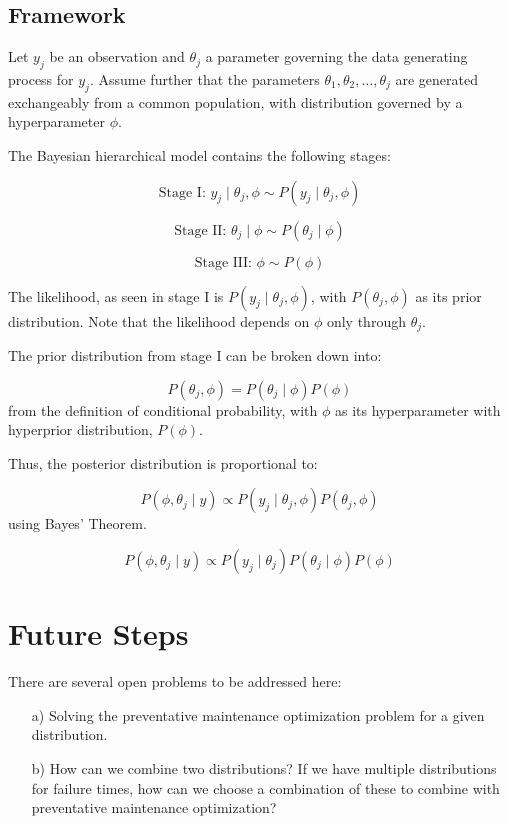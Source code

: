 \documentclass[english]{article}
\numberwithin{equation}{section}
\begin{document}
\subsection*{Framework}

Let $y_j$ be an observation and $\theta_j$ a parameter governing the data generating process for $y_j$. Assume further that the parameters $\theta_1, \theta_2, \ldots, \theta_j$ are generated exchangeably from a common population, with distribution governed by a hyperparameter $\phi$. 

The Bayesian hierarchical model contains the following stages:

$$\text{Stage I: } y_j\mid\theta_j,\phi \sim P(y_j\mid\theta_j,\phi)$$

$$\text{Stage II: } \theta_j\mid\phi \sim P(\theta_j\mid\phi)$$

$$\text{Stage III: } \phi \sim P(\phi)$$

The likelihood, as seen in stage I is $P(y_j\mid\theta_j,\phi)$, with $P(\theta_j,\phi)$ as its prior distribution. Note that the likelihood depends on $\phi$ only through $\theta_j$.

The prior distribution from stage I can be broken down into:

$$P(\theta_j,\phi) = P(\theta_j\mid\phi)P(\phi)$$ from the definition of conditional probability, with $\phi$ as its hyperparameter with hyperprior distribution, $P(\phi)$.

Thus, the posterior distribution is proportional to:

$$P(\phi,\theta_j\mid y)  \propto P(y_j \mid\theta_j,\phi) P(\theta_j,\phi)$$ using Bayes' Theorem.

$$P(\phi,\theta_j\mid y)  \propto P(y_j\mid\theta_j ) P(\theta_j \mid\phi ) P(\phi) $$

\section*{Future Steps}
There are several open problems to be addressed here:

\begin{itemize}
	\item [a)] Solving the preventative maintenance optimization problem for a given distribution.
	\item [b)] How can we combine two distributions? If we have multiple distributions for failure times, how can we choose a combination of these to combine with preventative maintenance optimization?
\end{itemize}
\end{document}

